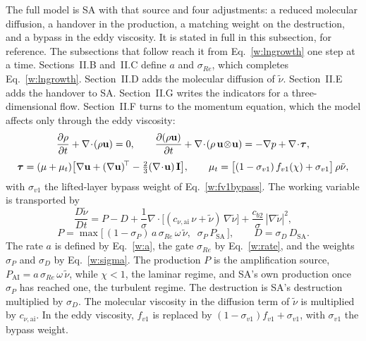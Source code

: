 \documentclass[conf]{new-aiaa}
\begin{document}
The full model is SA with that source and four adjustments: a reduced
molecular diffusion, a handover in the production, a matching weight on the
destruction, and a bypass in the eddy viscosity. It is stated in full in this
subsection, for reference. The subsections that follow reach it from
Eq.~\eqref{w:lngrowth} one step at a time. Sections~II.B and~II.C define $a$
and $\sigma_{Re}$, which completes Eq.~\eqref{w:lngrowth}. Section~II.D adds
the molecular diffusion of $\tilde\nu$. Section~II.E adds the handover to SA.
Section~II.G writes the indicators for a three-dimensional flow.
Section~II.F turns to the momentum equation, which the model affects only
through the eddy viscosity:
\begin{gather}
  \frac{\partial\rho}{\partial t} + \nabla\!\cdot\!(\rho\mathbf u) = 0,
  \qquad
  \frac{\partial(\rho\mathbf u)}{\partial t}
    + \nabla\!\cdot\!(\rho\,\mathbf u\!\otimes\!\mathbf u)
    = -\nabla p + \nabla\!\cdot\!\boldsymbol\tau, \notag\\[3pt]
  \boldsymbol\tau = (\mu+\mu_t)\big[\nabla\mathbf u
    + (\nabla\mathbf u)^{\!\top}
    - \tfrac23(\nabla\!\cdot\!\mathbf u)\,\mathbf I\big],
  \qquad
  \mu_t = \big[(1-\sigma_{v1})\,f_{v1}(\chi)+\sigma_{v1}\big]\,\rho\tilde\nu,
  \label{w:ns}
\end{gather}
with $\sigma_{v1}$ the lifted-layer bypass weight of Eq.~\eqref{w:fv1bypass}. The
working variable is transported by
\begin{equation}
  \frac{D\tilde\nu}{Dt} = P - D
  + \frac{1}{\sigma}\nabla\!\cdot\!\big[(c_{\nu,\mathrm{ai}}\,\nu+\tilde\nu)\,\nabla\tilde\nu\big]
  + \frac{c_{b2}}{\sigma}\,|\nabla\tilde\nu|^2,
  \label{w:sa}
\end{equation}
\begin{equation}
  P = \max\!\big[\,(1-\sigma_P)\,a\,\sigma_{Re}\,\omega\,\tilde\nu,\;\;\sigma_P\,P_\mathrm{SA}\,\big],
  \qquad
  D = \sigma_D\,D_\mathrm{SA} .
  \label{w:blend}
\end{equation}
The rate $a$ is defined by Eq.~\eqref{w:a}, the gate $\sigma_{Re}$ by Eq.~\eqref{w:rate}, and the
weights $\sigma_P$ and $\sigma_D$ by Eq.~\eqref{w:sigma}.
The production $P$ is the amplification source,
$P_\mathrm{AI}=a\,\sigma_{Re}\,\omega\,\tilde\nu$, while $\chi<1$, the laminar
regime, and SA's own production once $\sigma_P$ has reached one, the
turbulent regime. The destruction is SA's destruction multiplied by $\sigma_D$. The molecular viscosity in the diffusion term of
$\tilde\nu$ is multiplied by $c_{\nu,\mathrm{ai}}$. In the eddy viscosity, $f_{v1}$ is
replaced by $(1-\sigma_{v1})f_{v1}+\sigma_{v1}$, with $\sigma_{v1}$ the bypass weight.
\end{document}
